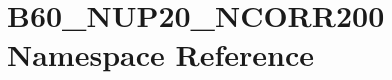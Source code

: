 \hypertarget{namespace_b60___n_u_p20___n_c_o_r_r200}{}\section{B60\+\_\+\+N\+U\+P20\+\_\+\+N\+C\+O\+R\+R200 Namespace Reference}
\label{namespace_b60___n_u_p20___n_c_o_r_r200}
